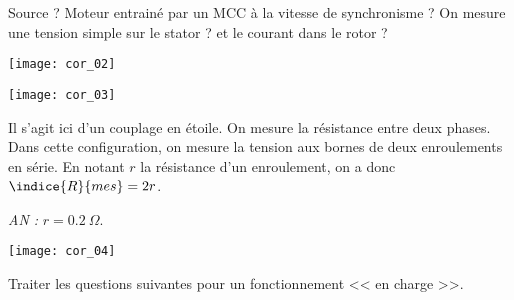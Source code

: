 \ifprof
\begin{corrige}
Source ? Moteur entrainé par un MCC à la vitesse de synchronisme ? On mesure une tension simple sur le stator ? et le courant dans le rotor ?
\end{corrige}
\else
\fi

\ifprof
\begin{marginfigure}
\texttt{[image: cor\_02]}
\end{marginfigure}

\begin{marginfigure}
\texttt{[image: cor\_03]}
\end{marginfigure}

\begin{corrige}
Il s'agit ici d'un couplage en étoile. On mesure la résistance entre deux phases. Dans cette configuration, on mesure la tension aux bornes de deux enroulements en série. En notant $r$ la résistance d'un enroulement, on a donc $\indice{R}{mes}=2r$.

\textit{AN :} $r = \SI{0,2}{\Omega}$.

\end{corrige}
\else
\fi



\ifprof
\begin{corrige}
\begin{center}
\texttt{[image: cor\_04]}
\end{center}
\end{corrige}
\else
\fi


Traiter les questions suivantes pour un fonctionnement << en charge >>.

\ifprof
\begin{corrige}
\end{corrige}
\else
\fi

\ifprof
\begin{corrige}
\end{corrige}
\else
\fi

\ifprof
\begin{corrige}
\end{corrige}
\else
\fi

\ifprof
\else
\begin{marginfigure}[-3cm]
\centering
\end{marginfigure}
\fi




